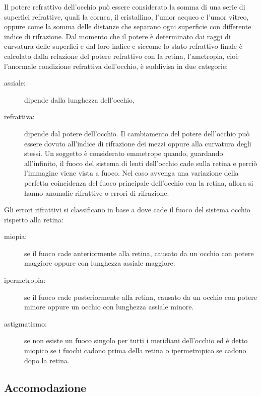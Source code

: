 Il potere refrattivo dell’occhio può essere considerato la somma di una serie di superfici refrattive, quali la cornea, il cristallino, l’umor acqueo e l’umor vitreo, oppure come la somma delle distanze che separano ogni superficie con differente indice di rifrazione. Dal momento che il potere è determinato dai raggi di curvatura delle superfici e dal loro indice e siccome lo stato refrattivo finale è calcolato dalla relazione del potere refrattivo con la retina, l’ametropia, cioè l’anormale condizione refrattiva dell’occhio, è suddivisa in due categorie:
 \begin{description} 
 \item[assiale:]dipende dalla lunghezza dell’occhio, 
 \item[refrattiva:]dipende dal potere dell’occhio. Il cambiamento del potere dell’occhio può essere dovuto all’indice di rifrazione dei mezzi oppure alla curvatura degli stessi.
Un soggetto è considerato emmetrope quando, guardando all’infinito, il fuoco del sistema di lenti dell’occhio cade sulla retina e perciò l’immagine viene vista a fuoco. Nel caso avvenga una variazione della perfetta coincidenza del fuoco principale dell’occhio con la retina, allora si hanno anomalie rifrattive o errori di rifrazione.
\end{description}
Gli errori rifrattivi si classificano in base a dove cade il fuoco del sistema occhio rispetto alla retina:
 \begin{description}
 \item[miopia:]se il fuoco cade anteriormente alla retina, causato da un occhio con potere maggiore oppure con lunghezza assiale maggiore.
 \item[ipermetropia:]se il fuoco cade posteriormente alla retina, causato da un occhio con potere minore oppure un occhio con lunghezza assiale minore.
 \item[astigmatismo:]se non esiste un fuoco singolo per tutti i meridiani dell’occhio ed è detto miopico se i fuochi cadono prima della retina o ipermetropico se cadono dopo la retina.
\end{description}


\subsection{Accomodazione}

